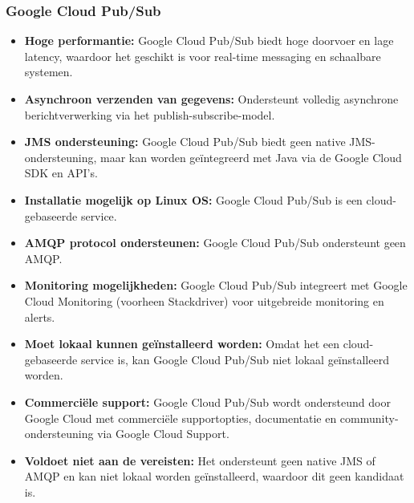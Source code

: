 \subsubsection{Google Cloud Pub/Sub}
\begin{itemize}
    \item \textbf{Hoge performantie:} Google Cloud Pub/Sub biedt hoge doorvoer en lage latency, waardoor het geschikt is voor real-time messaging en schaalbare systemen.
    \item \textbf{Asynchroon verzenden van gegevens:} Ondersteunt volledig asynchrone berichtverwerking via het publish-subscribe-model.
    \item \textbf{JMS ondersteuning:} Google Cloud Pub/Sub biedt geen native JMS-ondersteuning, maar kan worden geïntegreerd met Java via de Google Cloud SDK en API's.
    \item \textbf{Installatie mogelijk op Linux OS:} Google Cloud Pub/Sub is een cloud-gebaseerde service.
    \item \textbf{AMQP protocol ondersteunen:} Google Cloud Pub/Sub ondersteunt geen AMQP.
    \item \textbf{Monitoring mogelijkheden:} Google Cloud Pub/Sub integreert met Google Cloud Monitoring (voorheen Stackdriver) voor uitgebreide monitoring en alerts.
    \item \textbf{Moet lokaal kunnen geïnstalleerd worden:} Omdat het een cloud-gebaseerde service is, kan Google Cloud Pub/Sub niet lokaal geïnstalleerd worden.
    \item \textbf{Commerciële support:} Google Cloud Pub/Sub wordt ondersteund door Google Cloud met commerciële supportopties, documentatie en community-ondersteuning via Google Cloud Support.
    \item \textbf{Voldoet niet aan de vereisten:} Het ondersteunt geen native JMS of AMQP en kan niet lokaal worden geïnstalleerd, waardoor dit geen kandidaat is.
\end{itemize}


 
